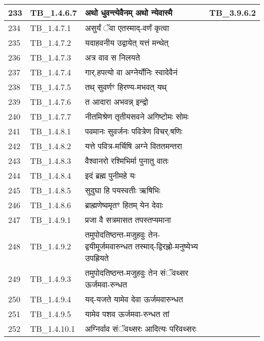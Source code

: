 \documentclass[17pt]{extarticle}
\begin{document}
\begin{longtable}{||p{0.4in}||p{0.9in}||p{4.0in}||p{0.9in}||}
        \hline
            233 & TB\_1.4.6.7 & अथो धुवन्त्येवैनम् अथो न्येवास्मै &  TB\_3.9.6.2       \\
        \hline
            234 & TB\_1.4.7.1 & असुर्यं ॅवा एतस्माद्{-}वर्णं कृत्वा &      \\
        \hline
            235 & TB\_1.4.7.2 & यदाहवनीय उद्वायेत् यत्तं मन्थेत् &      \\
        \hline
            236 & TB\_1.4.7.3 & अत्र वाव स निलयते &      \\
        \hline
            237 & TB\_1.4.7.4 & गार्.हपत्यो वा अग्नेर्योनिः स्वादेवैनं &      \\
        \hline
            238 & TB\_1.4.7.5 & तथ् सुवर्णꣳ हिरण्य{-}मभवत् यथ् &      \\
        \hline
            239 & TB\_1.4.7.6 & त आदारा अभवन्न् इन्द्रो &      \\
        \hline
            240 & TB\_1.4.7.7 & नीतमिश्रेण तृतीयसवने अगिष्टोमः सोमः &      \\
        \hline
            241 & TB\_1.4.8.1 & पवमानः सुवर्जनः पवित्रेण विचर्.षणिः &      \\
        \hline
            242 & TB\_1.4.8.2 & यत्ते पवित्र{-}मर्चिषि अग्ने विततमन्तरा &      \\
        \hline
            243 & TB\_1.4.8.3 & वैश्वानरो रश्मिभिर्मा पुनातु वातः &      \\
        \hline
            244 & TB\_1.4.8.4 & इदं ब्रह्म पुनीमहे यः &      \\
        \hline
            245 & TB\_1.4.8.5 & सुदुघा हि पयस्वतीः ऋषिभिः &      \\
        \hline
            246 & TB\_1.4.8.6 & ब्राह्मणेष्वमृतꣳ हितम् येन देवाः &      \\
        \hline
            247 & TB\_1.4.9.1 & प्रजा वै सत्रमासत तपस्तप्यमाना &      \\
        \hline
            248 & TB\_1.4.9.2 & तमुपोदतिष्ठन्त{-}मजुहवुः तेन{-}द्वयीमूर्जमवारुन्धत तस्माद्{-}द्विरह्नो{-}मनुष्येभ्य उपह्रियते &      \\
        \hline
            249 & TB\_1.4.9.3 & तमुपोदतिष्ठन्त{-}मजुहवुः तेन संॅवथ्सर ऊर्जमवा{-}रुन्धत &      \\
        \hline
            250 & TB\_1.4.9.4 & यद्{-}यजते यामेव देवा ऊर्जमवारुन्धत &      \\
        \hline
            251 & TB\_1.4.9.5 & यामेव पशव ऊर्जमवा{-}रुन्धत तां &      \\
        \hline
            252 & TB\_1.4.10.1 & अग्निर्वाव संॅवथ्सरः आदित्यः परिवथ्सरः &      \\

\end{longtable}
\end{document}
